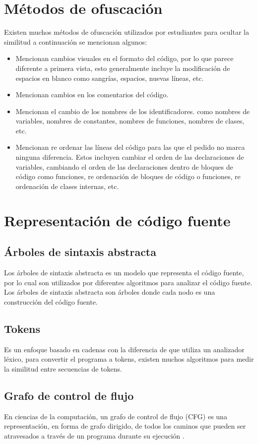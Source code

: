 \section{Métodos de ofuscación}
Existen muchos métodos de ofuscación utilizados por estudiantes para ocultar la similitud a continuación se mencionan algunos:
\begin{itemize}
    \item \cite{article3} Mencionan cambios visuales en el formato del código, por lo que parece diferente a primera vista, esto generalmente incluye la modificación de espacios en blanco como sangrías, espacios, nuevas líneas, etc.
    \item \cite{article3} Mencionan cambios en los comentarios del código.
    \item \cite{donaldson1981plagiarism} Mencionan el cambio de los nombres de los identificadores. como nombres de variables, nombres de constantes, nombres de funciones, nombres de clases, etc.
    \item \cite{donaldson1981plagiarism} Mencionan re ordenar las líneas del código para las que el pedido no marca ninguna diferencia. Estos incluyen cambiar el orden de las declaraciones de variables, cambiando el orden de las declaraciones dentro de bloques de código como funciones, re ordenación de bloques de código o funciones, re ordenación de clases internas, etc.
\end{itemize}

\section{Representación de código fuente}
\subsection{Árboles de sintaxis abstracta}
Los árboles de sintaxis abstracta  es un modelo que representa el código fuente, por lo cual son utilizados por diferentes algoritmos para analizar el código fuente. Los árboles de sintaxis abstracta son árboles donde cada nodo es una construcción del código fuente.
\subsection{Tokens}
Es un enfoque basado en cadenas con la diferencia de que utiliza un analizador léxico, para convertir el programa a tokens, existen muchos algoritmos para medir la similitud entre secuencias de tokens.
\subsection{Grafo de control de flujo}
En ciencias de la computación, un grafo de control de flujo (CFG) es una representación, en forma de grafo dirigido, de todos los caminos que pueden ser atravesados a través de un programa durante su ejecución \cite{wiki:Control-flow_graph}.
